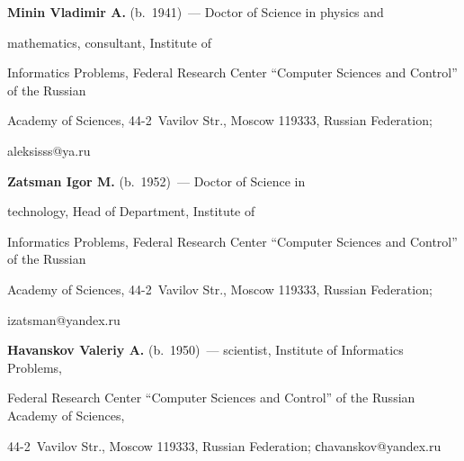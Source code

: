       


      


      \Contr


      


      \noindent


      \textbf{Minin Vladimir A.} (b.\ 1941)~--- Doctor of Science in physics and


      mathematics, consultant, Institute of 


Informatics Problems, Federal Research Center ``Computer Sciences and Control'' of the Russian 


Academy of Sciences, 44-2~Vavilov Str., Moscow 119333, Russian Federation; 


\mbox{aleksisss@ya.ru}


      


      \vspace*{3pt}


      


      \noindent


      \textbf{Zatsman Igor M.} (b.\ 1952)~--- Doctor of Science in


      technology, Head of Department, Institute of 


Informatics Problems, Federal Research Center ``Computer Sciences and Control'' of the Russian 


Academy of Sciences, 44-2~Vavilov Str., Moscow 119333, Russian Federation; 


\mbox{izatsman@yandex.ru}


      


      \vspace*{3pt}


      


      \noindent


      \textbf{Havanskov Valeriy A.} (b.\ 1950)~--- scientist, Institute of Informatics Problems, 


Federal Research Center ``Computer Sciences and Control'' of the Russian Academy of Sciences,  


44-2~Vavilov Str., Moscow 119333, Russian Federation; \mbox{сhavanskov@yandex.ru}


      


      \vspace*{3pt}


